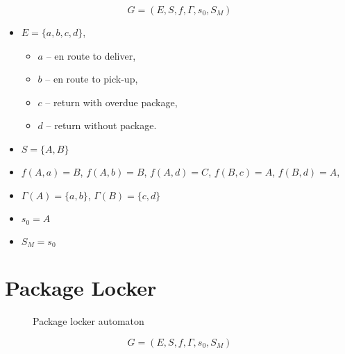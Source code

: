 \begin{equation*}
    G = (E,S,f,\Gamma, s_0, S_M)
\end{equation*}

\begin{itemize}
    \item $E = \{a,b,c,d\}$,
    \begin{itemize}
        \item $a$ -- en route to deliver,
        \item $b$ -- en route to pick-up,
        \item $c$ -- return with overdue package,
        \item $d$ -- return without package.
    \end{itemize}
    \item $S = \{A, B\}$
    \item $f(A,a) = B$, $f(A,b) = B$, $f(A,d) = C$, $f(B,c) = A$, $f(B,d) = A$,
    \item $\Gamma(A) = \{a,b\}$, $\Gamma(B) = \{c,d\}$
    \item $s_0 = A$
    \item $S_M = s_0$
\end{itemize}

\newpage

\section{Package Locker}


\begin{figure}[htbp]
  \centering
  
  \caption{Package locker automaton}
\end{figure}

\begin{equation*}
    G = (E,S,f,\Gamma, s_0, S_M)
\end{equation*}

